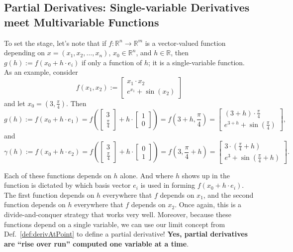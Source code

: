 \subsection{Partial Derivatives: Single-variable Derivatives meet Multivariable Functions}
\label{sec:PartialDerivatives}

To set the stage, let's note that if \(f:\mathbb{R}^{n} \to \mathbb{R}^{m}\) is a vector-valued function depending on \(x=(x_1, x_2, \ldots, x_n)\), \(x_0 \in \mathbb{R}^{n}\), and \(h \in \mathbb{R}\), then \(g(h):= f(x_0 + h \cdot e_i)\) if only a function of \(h\); it is a single-variable function. As an example, consider
\[
f(x_1, x_2) := \left[ \begin{array}{c} x_1 \cdot x_2 \\ e^{x_1} + \sin(x_2) \end{array}\right]
\]
and let \(x_0= (3, \frac{\pi}{4})\). Then
\[
g(h):= f(x_0 + h \cdot e_1) = f\left( \left[ \begin{array}{c} 3 \\ \frac{\pi}{4} \end{array}\right] + h\cdot \left[ \begin{array}{c} 1 \\ 0 \end{array}\right]\right) =f(3+h, \frac{\pi}{4}) = \left[ \begin{array}{c} (3 + h) \cdot \frac{\pi}{4}\\ e^{3 + h} + \sin\left(\frac{\pi}{4}\right) \end{array}\right],
\]
and
\[
\gamma(h):= f(x_0 + h \cdot e_2) = f\left( \left[ \begin{array}{c} 3 \\ \frac{\pi}{4} \end{array}\right] + h\cdot \left[ \begin{array}{c} 0 \\ 1 \end{array}\right]\right) = f(3, \frac{\pi}{4} +h) = \left[ \begin{array}{c} 3 \cdot \left( \frac{\pi}{4} +h \right) \\ e^{3} + \sin\left(\frac{\pi}{4} +h\right) \end{array}\right].
\]

Each of these functions depends on \(h\) alone. And where \(h\) shows up in the function is dictated by which basis vector \(e_i\) is used in forming \(f(x_0 + h \cdot e_i)\). The first function depends on \(h\) everywhere that \(f\) depends on \(x_1\), and the second function depends on \(h\) everywhere that \(f\) depends on \(x_2\). Once again, this is a divide-and-conquer strategy that works very well. Moreover, because these functions depend on a single variable, we can use our limit concept from Def.~\ref{def:derivAtPoint} to define a partial derivative! \textbf{Yes, partial derivatives are ``rise over run'' computed one variable at a time}.

